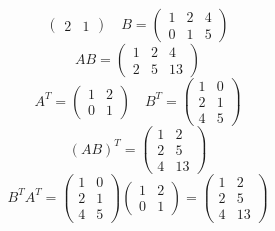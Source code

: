 \documentclass[a4paper]{article}
\theoremstyle{break}
\theoremstyle{break}
\theoremstyle{break}
\theoremstyle{break}
\begin{document}
\begin{itemize}
\begin{figure}[H]
\begin{example}
\[\begin{pmatrix}
                2 & 1
              \end{pmatrix} 
              \quad
              B = \begin{pmatrix} 
                1 & 2 & 4\\
                0 & 1 & 5
              \end{pmatrix} 
            \] 
            \[
            AB = \begin{pmatrix} 
              1 & 2 & 4\\
              2 & 5 & 13
            \end{pmatrix} 
            \] 
            \[
              A^T = \begin{pmatrix}
              1 & 2\\
              0 & 1
            \end{pmatrix} 
            \quad
            B^T = \begin{pmatrix} 
              1 & 0\\
              2 & 1\\
              4 & 5
            \end{pmatrix} 
            \] 
            \[
              (AB)^T = \begin{pmatrix} 
                1 & 2\\
                2 & 5\\
                4 & 13
              \end{pmatrix} 
            \] 
            \[
            B^T A^T = \begin{pmatrix} 
              1 & 0\\
              2 & 1\\
              4 & 5 
            \end{pmatrix}
            \begin{pmatrix} 
              1 & 2\\
              0 & 1
            \end{pmatrix}
            =
            \begin{pmatrix} 
              1 & 2\\
              2 & 5\\
              4 & 13
            \end{pmatrix}
            \] 
          \end{example}
        \end{figure}


\end{itemize}
\end{document}
